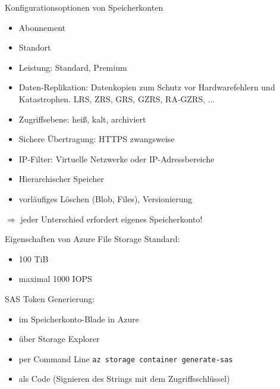 \begin{flashcard}[Definition]{Konfigurationsoptionen von Speicherkonten}
    \begin{itemize}
        \item Abonnement
        \item Standort
        \item Leistung: Standard, Premium
        \item Daten-Replikation: Datenkopien zum Schutz vor Hardwarefehlern und Katastrophen. LRS, ZRS, GRS, GZRS, RA-GZRS, ...
        \item Zugriffsebene: heiß, kalt, archiviert
        \item Sichere Übertragung: HTTPS zwangsweise
        \item IP-Filter: Virtuelle Netzwerke oder IP-Adressbereiche
        \item Hierarchischer Speicher
        \item vorläufiges Löschen (Blob, Files), Versionierung
    \end{itemize}
    $\Rightarrow$ jeder Unterschied erfordert eigenes Speicherkonto!
\end{flashcard}

\begin{flashcard}[Definition]{Eigenschaften von Azure File Storage}
    Standard:
    \begin{itemize}
        \item 100 TiB
        \item maximal 1000 IOPS
    \end{itemize}
\end{flashcard}


\begin{flashcard}[Definition]{SAS Token}
    Generierung:
    \begin{itemize}
        \item im Speicherkonto-Blade in Azure
        \item über Storage Explorer
        \item per Command Line\newline
            \texttt{az storage container generate-sas}
        \item als Code (Signieren des Strings mit dem Zugriffsschlüssel)
    \end{itemize}
\end{flashcard}

